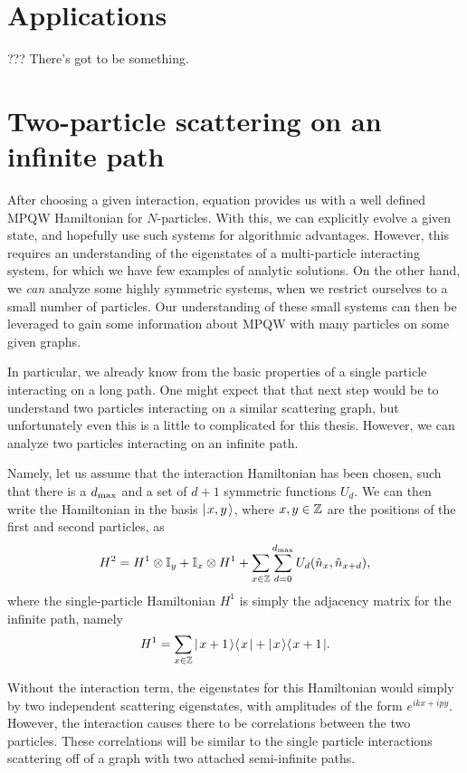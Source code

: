 \documentclass[../thesis-main/thesis-main]{subfiles}
\begin{document}
\section{Applications}

??? There's got to be something.

\section{Two-particle scattering on an infinite path}

After choosing a given interaction, equation  provides us with a well defined MPQW Hamiltonian for $N$-particles.  With this, we can explicitly evolve a given state, and hopefully use such systems for algorithmic advantages.  However, this requires an understanding of the eigenstates of a multi-particle interacting system, for which we have few examples of analytic solutions.  On the other hand, we \emph{can} analyze some highly symmetric systems, when we restrict ourselves to a small number of particles.  Our understanding of these small systems can then be leveraged to gain some information about MPQW with many particles on some given graphs.

In particular, we already know from  the basic properties of a single particle interacting on a long path.  One might expect that that next step would be to understand two particles interacting on a similar scattering graph, but unfortunately even this is a little to complicated for this thesis.  However, we can analyze two particles interacting on an infinite path.

Namely, let us assume that the interaction Hamiltonian has been chosen, such that there is a $d_{\text{max}}$ and a set of $d+1$ symmetric functions $U_d$.  We can then write the Hamiltonian  in the basis $|\mspace{2mu} x,y \mspace{2mu} \rangle$, where $x,y\in \mathbb{Z}$ are the positions of the first and second particles, as
\begin{align}
  H^{2} = H^1 \otimes \mathbb{I}_y + \mathbb{I}_x \otimes H^1 + \sum_{x\in \mathbb{Z}} \sum_{d=0}^{d_{\text{max}}} U_{d} (\hat{n}_x,\hat{n}_{x+d}) ,
  \label{eq:two_part_H_xy}
\end{align}
where the single-particle Hamiltonian $H^1$ is simply the adjacency matrix for the infinite path, namely
\begin{align}
  H^{1} = \sum_{x\in\mathbb{Z}} |\mspace{2mu} x+1 \mspace{2mu} \rangle\langle\mspace{2mu} x \mspace{2mu} | + |\mspace{2mu} x \mspace{2mu} \rangle\langle\mspace{2mu} x+1 \mspace{2mu} |.
\end{align}

Without the interaction term, the eigenstates for this Hamiltonian would simply by two independent scattering eigenstates, with amplitudes of the form $e^{i k x + i py}$.  However, the interaction causes there to be correlations between the two particles.  These correlations will be similar to the single particle interactions scattering off of a graph with two attached semi-infinite paths.
\end{document}
